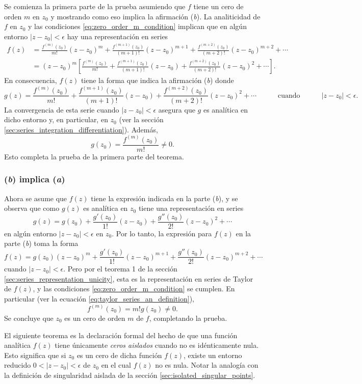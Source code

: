 \documentclass[a4paper]{report}
\begin{document}
Se comienza la primera parte de la prueba asumiendo que \(f\) tiene un cero de orden \(m\) en \(z_0\) y mostrando como eso implica la afirmación (\textit{b}). La analiticidad de \(f\) en \(z_0\) y las condiciones \ref{eq:zero_order_m_condition} implican que en algún entorno \(|z-z_0|<\epsilon\) hay una representación en series
\begin{align*}
 f(z)&=\frac{f^{(m)}(z_0)}{m!}(z-z_0)^m+\frac{f^{(m+1)}(z_0)}{(m+1)!}(z-z_0)^{m+1}+\frac{f^{(m+2)}(z_0)}{(m+2)!}(z-z_0)^{m+2}+\cdots\\
  &=(z-z_0)^m\left[\frac{f^{(m)}(z_0)}{m!}+\frac{f^{(m+1)}(z_0)}{(m+1)!}(z-z_0)+\frac{f^{(m+2)}(z_0)}{(m+2)!}(z-z_0)^2+\cdots\right].
\end{align*}
En consecuencia, \(f(z)\) tiene la forma que indica la afirmación (\textit{b}) donde 
\[
 g(z)=\frac{f^{(m)}(z_0)}{m!}+\frac{f^{(m+1)}(z_0)}{(m+1)!}(z-z_0)+\frac{f^{(m+2)}(z_0)}{(m+2)!}(z-z_0)^2+\cdots
 \qquad\quad\textrm{cuando}\qquad\quad
 |z-z_0|<\epsilon.
\]
La convergencia de esta serie cuando \(|z-z_0|<\epsilon\) asegura que \(g\) es analítica en dicho entorno y, en particular, en \(z_0\) (ver la sección \ref{sec:series_integration_differentiation}). Además,
\[
 g(z_0)=\frac{f^{(m)}(z_0)}{m!}\neq0.
\]
Esto completa la prueba de la primera parte del teorema.

\subsubsection*{(\textit{b}) implica (\textit{a})}

Ahora se asume que \(f(z)\) tiene la expresión indicada en la parte (\textit{b}), y se observa que como \(g(z)\) es analítica en \(z_0\) tiene una representación en series 
\[
 g(z)=g(z_0)+\frac{g'(z_0)}{1!}(z-z_0)+\frac{g''(z_0)}{2!}(z-z_0)^2+\cdots 
\]
en algún entorno \(|z-z_0|<\epsilon\) en \(z_0\). Por lo tanto, la expresión para \(f(z)\) en la parte (\textit{b}) toma la forma 
\[
 f(z)=g(z_0)(z-z_0)^m+\frac{g'(z_0)}{1!}(z-z_0)^{m+1}+\frac{g''(z_0)}{2!}(z-z_0)^{m+2}+\cdots 
\]
cuando \(|z-z_0|<\epsilon\). Pero por el teorema 1 de la sección \ref{sec:series_representation_unicity}, esta es la representación en series de Taylor de \(f(z)\), y las condiciones \ref{eq:zero_order_m_condition} se cumplen. En particular (ver la ecuación \ref{eq:taylor_series_an_definition}),
\[
 f^{(m)}(z_0)=m!g(z_0)\neq0.
\]
Se concluye que \(z_0\) es un cero de orden \(m\) de \(f\), completando la prueba.

El siguiente teorema es la declaración formal del hecho de que una función analítica \(f(z)\) tiene únicamente \emph{ceros aislados} cuando no es idénticamente nula. Esto significa que si \(z_0\) es un cero de dicha función \(f(z)\), existe un entorno reducido \(0<|z-z_0|<\epsilon\) de \(z_0\) en el cual \(f(z)\) no es nula. Notar la analogía con la definición de singularidad aislada de la sección \ref{sec:isolated_singular_points}. 
\end{document}
